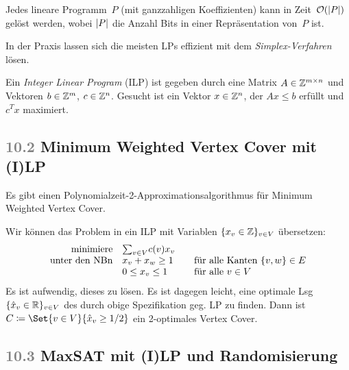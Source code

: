 \documentclass{cheat-sheet}
\newcommand{\size}[1]{\abs{#1}} %
\renewcommand{\O}{\mathcal{O}} %
\newcommand{\Problem}[1]{\textcolor{ProblemColor}{\textbf{#1}}}
\newcommand{\scriptSection}[1]{\textcolor{gray}{#1}\enspace}
\begin{document}
\begin{resultat}
  Jedes lineare Programm~$P$ (mit ganzzahligen Koeffizienten) kann in Zeit~$\O(\size{P})$ gelöst werden, wobei $\size{P}$ die Anzahl Bits in einer Repräsentation von~$P$ ist.
\end{resultat}

\begin{bem}
  In der Praxis lassen sich die meisten LPs effizient mit dem \textit{Simplex-Verfahren} lösen.
\end{bem}

\begin{defn}
  Ein \emph{Integer Linear Program} (ILP) ist gegeben durch eine Matrix $A \in \mathbb{Z}^{m \times n}$ und Vektoren $b \in \mathbb{Z}^m$, $c \in \mathbb{Z}^n$.
  Gesucht ist ein Vektor $x \in \mathbb{Z}^n$, der $A x \leq b$ erfüllt und $c^T x$ maximiert.
\end{defn}

\subsection{\scriptSection{10.2} \Problem{Minimum Weighted Vertex Cover} mit (I)LP}

\begin{satz}
  Es gibt einen Polynomialzeit-2-Approximationsalgorithmus für Minimum Weighted Vertex Cover.
\end{satz}

\begin{beweisskizze}
  Wir können das Problem in ein ILP mit Variablen $\{ x_v \in \mathbb{Z} \}_{v \in V}$ übersetzen:
  \[
    \begin{array}{r l l}
      \text{minimiere} & {\sum}_{v \in V} c(v) x_v \\
      \text{unter den NBn} & x_v + x_w \geq 1 & \quad \text{für alle Kanten } \{ v, w \} \in E \\
      & 0 \leq x_v \leq 1 & \quad \text{für alle $v \in V$}
    \end{array}
  \]
  Es ist aufwendig, dieses zu lösen.
  Es ist dagegen leicht, eine optimale Lsg $\{ \hat{x}_v \in \mathbb{R} \}_{v \in V}$ des durch obige Spezifikation geg. LP zu finden.
  Dann ist $C \coloneqq \Set{v \in V}{\hat{x}_v \geq 1/2}$ ein 2-optimales Vertex Cover.
\end{beweisskizze}

\subsection{\scriptSection{10.3} \Problem{MaxSAT} mit (I)LP und Randomisierung}
\end{document}
